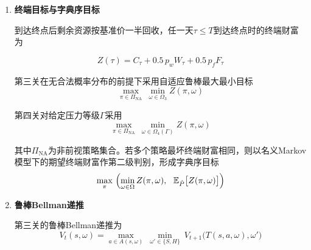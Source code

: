 \documentclass{cumcmthesis}
\numberwithin{equation}{section}
\numberwithin{figure}{section}
\numberwithin{table}{section}
\begin{document}
\begin{enumerate}
    \hspace*{2em}即玩家不能在抵达村庄前就消耗村庄补给——当从非村庄节点行至村庄时，移动途中的消耗只能由出发时的库存承担；只有到达村庄后，当天的补给才会计入库存。

    \item  \textbf{终端目标与字典序目标}
    
    \hspace*{2em}到达终点后剩余资源按基准价一半回收，任一天$\tau\le T$到达终点时的终端财富为

\vspace{-10pt}    \begin{equation}
Z(\tau)=C_\tau+0.5\,p_w W_\tau+0.5\,p_f F_\tau
\label{eq:q2_terminal}
\end{equation}

\hspace*{2em}第三关在无合法概率分布的前提下采用自适应鲁棒最大最小目标
\vspace{-10pt}
\begin{equation}
\max_{\pi\in\Pi_{\text{NA}}}\ \min_{\omega\in\Omega_3} Z(\pi,\omega)
\label{eq:q2_obj3}
\end{equation}

\hspace*{2em}第四关对给定压力等级$\Gamma$采用
\vspace{-10pt}
\begin{equation}
\max_{\pi\in\Pi_{\text{NA}}}\ \min_{\omega\in\Omega_4(\Gamma)} Z(\pi,\omega)
\label{eq:q2_obj4}
\end{equation}

\hspace*{2em}其中$\Pi_{\text{NA}}$为非前视策略集合。若多个策略最坏终端财富相同，则以名义Markov模型下的期望终端财富作第二级判别，形成字典序目标
\vspace{-10pt}
\begin{equation}
\max_{\pi}\ \Bigl(\min_{\omega\in\Omega} Z(\pi,\omega),\ \ \mathbb{E}_{\hat{P}}\bigl[Z(\pi,\omega)\bigr]\Bigr)
\label{eq:q2_lex}
\end{equation}

    \item  \textbf{鲁棒Bellman递推}
    
    \hspace*{2em}第三关的鲁棒Bellman递推为
\vspace{-10pt}
\begin{equation}
V_t(s,\omega)=\max_{a\in A(s,\omega)}\ \min_{\omega'\in\{S,H\}}\ V_{t+1}\bigl(T(s,a,\omega),\omega'\bigr)
\label{eq:q2_bellman3}
\end{equation}


\end{enumerate}
\end{document}

